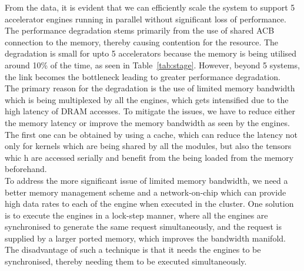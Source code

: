 \documentclass[a4paper,12pt, final]{report}
\begin{document}
From the data, it is evident that we can efficiently scale the system to support 5 accelerator engines running in parallel without significant loss of performance. The performance degradation stems primarily from the use of shared ACB connection to the memory, thereby causing contention for the resource. The degradation is small for upto 5 accelerators because the memory is being utilised around 10\% of the time, as seen in Table~\ref{tab:stage}. However, beyond 5 systems, the link becomes the bottleneck leading to greater performance degradation.
\\

The primary reason for the degradation is the use of limited memory bandwidth which is being multiplexed by all the engines, which gets intensified due to the high latency of DRAM accesses. To mitigate the issues, we have to reduce either the memory latency or improve the memory bandwidth as seen by the engines. The first one can be obtained by using a cache, which can reduce the latency not only for kernels which are being shared by all the modules, but also the tensors whic h are accessed serially and benefit from the being loaded from the memory beforehand.
\\

To address the more significant issue of limited memory bandwidth, we need a better memory management scheme and a network-on-chip which can provide high data rates to each of the engine when executed in the cluster. One solution is to execute the engines in a lock-step manner, where all the engines are synchronised to generate the same request simultaneously, and the request is supplied by a larger ported memory, which improves the bandwidth manifold. The disadvantage of such a technique is that it needs the engines to be synchronised, thereby needing them to be executed simultaneously.
\end{document}
